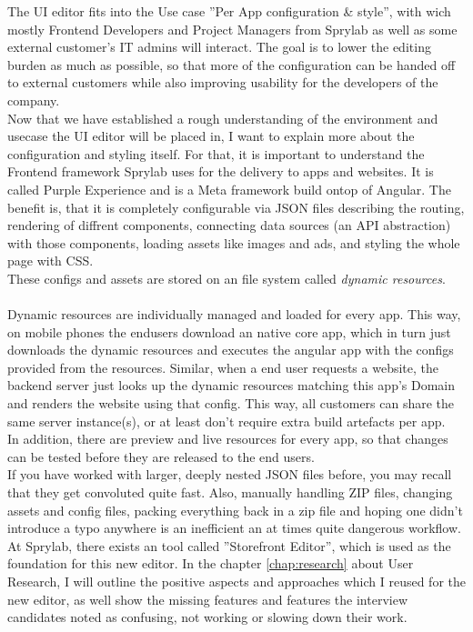 The UI editor fits into the Use case ''Per App configuration \& style'', with wich mostly Frontend Developers and Project Managers from Sprylab as well as some external customer's IT admins will interact. The goal is to lower the editing burden as much as possible, so that more of the configuration can be handed off to external customers while also improving usability for the developers of the company.
\\
Now that we have established a rough understanding of the environment and usecase the UI editor will be placed in, I want to explain more about the configuration and styling itself.
For that, it is important to understand the Frontend framework Sprylab uses for the delivery to apps and websites. It is called Purple Experience and is a Meta framework build ontop of Angular. The benefit is, that it is completely configurable via JSON files describing the routing, rendering of diffrent components,
connecting data sources (an API abstraction) with those components, loading assets like images and ads, and styling the whole page with CSS.
\\
These configs and assets are stored on an file system called \label{def:DynamicResources} \textit{dynamic resources}.
\\\\
Dynamic resources are individually managed and loaded for every app. This way, on mobile phones the endusers download an native core app, which in turn just downloads the dynamic resources and executes the angular app with the configs provided from the resources.
Similar, when a end user requests a website, the backend server just looks up the dynamic resources matching this app's Domain and renders the website using that config.
This way, all customers can share the same server instance(s), or at least don't require extra build artefacts per app.
\\
In addition, there are preview and live resources for every app, so that changes can be tested before they are released to the end users.
\\
If you have worked with larger, deeply nested JSON files before, you may recall that they get convoluted quite fast.
Also, manually handling ZIP files, changing assets and config files, packing everything back in a zip file and hoping one didn't introduce a typo anywhere is an inefficient an at times quite dangerous workflow.
\\
At Sprylab, there exists an tool called ''Storefront Editor'', which is used as the foundation for this new editor.
In the chapter \ref{chap:research} about User Research, I will outline the positive aspects and approaches which I reused for the new editor,
as well show the missing features and features the interview candidates noted as confusing, not working or slowing down their work.

